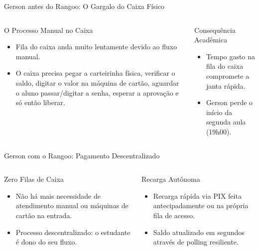 \documentclass[10pt, aspectratio=169]{beamer}
\begin{document}
\begin{frame}{Gerson antes do Rangoo: O Gargalo do Caixa Físico}
  \begin{columns}[T,onlytextwidth]
      \begin{alertblock}{O Processo Manual no Caixa}
        \small
        \begin{itemize}
          \item Fila do caixa anda muito lentamente devido ao fluxo manual.
          \item O caixa precisa pegar a carteirinha física, verificar o saldo, digitar o valor na máquina de cartão, aguardar o aluno passar/digitar a senha, esperar a aprovação e só então liberar.
        \end{itemize}
      \end{alertblock}

      \begin{block}{Consequência Acadêmica}
        \small
        \begin{itemize}
          \item Tempo gasto na fila do caixa compromete a janta rápida.
          \item Gerson perde o início da segunda aula (19h00).
        \end{itemize}
      \end{block}
  \end{columns}
\end{frame}

\begin{frame}{Gerson com o Rangoo: Pagamento Descentralizado}
  \begin{columns}[T,onlytextwidth]
      \begin{block}{Zero Filas de Caixa}
        \small
        \begin{itemize}
          \item Não há mais necessidade de atendimento manual ou máquinas de cartão na entrada.
          \item Processo descentralizado: o estudante é dono do seu fluxo.
        \end{itemize}
      \end{block}

      \begin{exampleblock}{Recarga Autônoma}
        \small
        \begin{itemize}
          \item Recarga rápida via PIX feita antecipadamente ou na própria fila de acesso.
          \item Saldo atualizado em segundos através de polling resiliente.
        \end{itemize}
      \end{exampleblock}
  \end{columns}
\end{frame}
\end{document}
